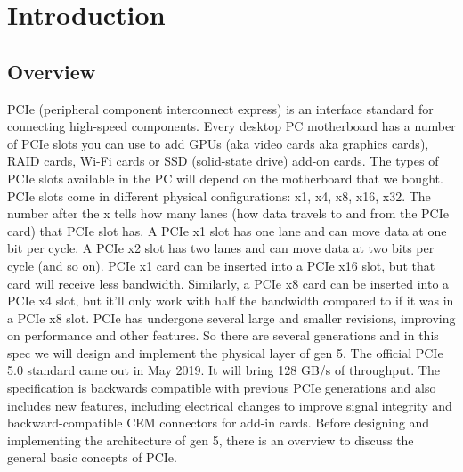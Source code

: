 \chapter{Introduction}

\section{Overview}

PCIe (peripheral component interconnect express) is an interface standard for connecting
high-speed components. Every desktop PC motherboard has a number of PCIe slots you
can use to add GPUs (aka video cards aka graphics cards), RAID cards, Wi-Fi cards or SSD (solid-state drive) add-on cards. The types of PCIe slots available in the PC will depend on the motherboard that we bought. 
 \newline
PCIe slots come in different physical configurations: x1, x4, x8, x16, x32. The number after the x tells how many lanes (how data travels to and from the PCIe card) that PCIe
slot has. A PCIe x1 slot has one lane and can move data at one bit per cycle. A PCIe x2 slot
has two lanes and can move data at two bits per cycle (and so on).
\newline 
PCIe x1 card can be inserted into a PCIe x16 slot, but that card will receive less
bandwidth. Similarly, a PCIe x8 card can be inserted into a PCIe x4 slot, but it’ll only work
with half the bandwidth compared to if it was in a PCIe x8 slot.\newline
PCIe has undergone several large and smaller revisions, improving on performance and
other features. So there are several generations and in this spec we will design and
implement the physical layer of gen 5. The official PCIe 5.0 standard came out in May
2019. It will bring 128 GB/s of throughput. The specification is backwards compatible with
previous PCIe generations and also includes new features, including electrical changes to
improve signal integrity and backward-compatible CEM connectors for add-in cards.
Before designing and implementing the architecture of gen 5, there is an overview to
discuss the general basic concepts of PCIe.
